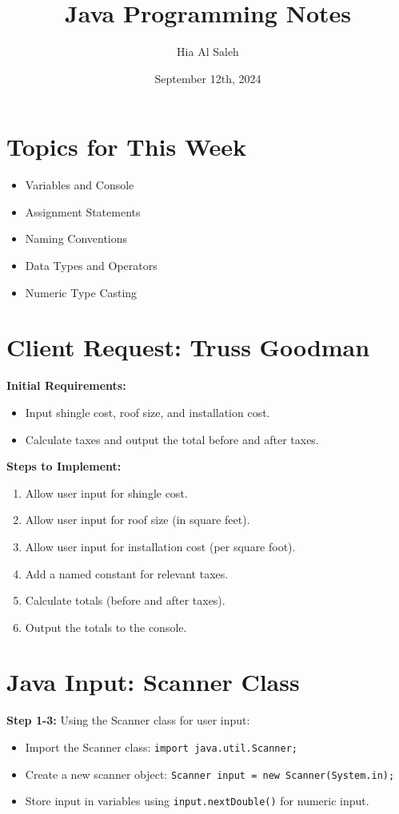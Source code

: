 \documentclass{article}
\title{Java Programming Notes}
\author{Hia Al Saleh}
\date{September 12th, 2024}
\begin{document}
\maketitle
\tableofcontents
\newpage 
\section{Topics for This Week}
\begin{itemize}
    \item Variables and Console
    \item Assignment Statements
    \item Naming Conventions
    \item Data Types and Operators
    \item Numeric Type Casting
\end{itemize}

\section{Client Request: Truss Goodman}
\textbf{Initial Requirements:}
\begin{itemize}
    \item Input shingle cost, roof size, and installation cost.
    \item Calculate taxes and output the total before and after taxes.
\end{itemize}

\textbf{Steps to Implement:}
\begin{enumerate}
    \item Allow user input for shingle cost.
    \item Allow user input for roof size (in square feet).
    \item Allow user input for installation cost (per square foot).
    \item Add a named constant for relevant taxes.
    \item Calculate totals (before and after taxes).
    \item Output the totals to the console.
\end{enumerate}

\section{Java Input: Scanner Class}
\textbf{Step 1-3:} Using the Scanner class for user input:
\begin{itemize}
    \item Import the Scanner class: \texttt{import java.util.Scanner;}
    \item Create a new scanner object: \texttt{Scanner input = new Scanner(System.in);}
    \item Store input in variables using \texttt{input.nextDouble()} for numeric input.
\end{itemize}
\end{document}
